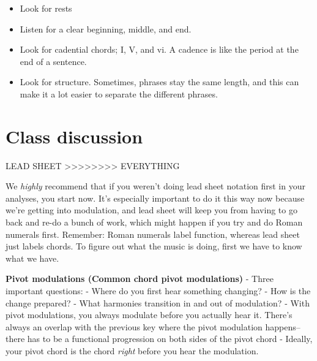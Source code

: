 \documentclass{book}
\providecommand{\tightlist}{%
  \setlength{\itemsep}{0pt}\setlength{\parskip}{0pt}}
\begin{document}
\begin{itemize}
\tightlist
\item
  Look for rests
\item
  Listen for a clear beginning, middle, and end.
\item
  Look for cadential chords; I, V, and vi. A cadence is like the period at the
  end of a sentence.
\item
  Look for structure. Sometimes, phrases stay the same length, and this can
  make it a lot easier to separate the different phrases.
\end{itemize}

\hypertarget{class-discussion-43}{%
\chapter{Class discussion}\label{class-discussion-43}}

LEAD SHEET
\textgreater\textgreater\textgreater\textgreater\textgreater\textgreater\textgreater\textgreater{}
EVERYTHING

We \emph{highly} recommend that if you weren't doing lead sheet notation first
in your analyses, you start now. It's especially important to do it this way
now because we're getting into modulation, and lead sheet will keep you from
having to go back and re-do a bunch of work, which might happen if you try and
do Roman numerals first. Remember: Roman numerals label function, whereas lead
sheet just labels chords. To figure out what the music is doing, first we have
to know what we have.

\textbf{Pivot modulations (Common chord pivot modulations)} - Three important
questions: - Where do you first hear something changing? - How is the change
prepared? - What harmonies transition in and out of modulation? - With pivot
modulations, you always modulate before you actually hear it. There's always
an overlap with the previous key where the pivot modulation happens--there has
to be a functional progression on both sides of the pivot chord - Ideally,
your pivot chord is the chord \emph{right} before you hear the modulation.
\end{document}
